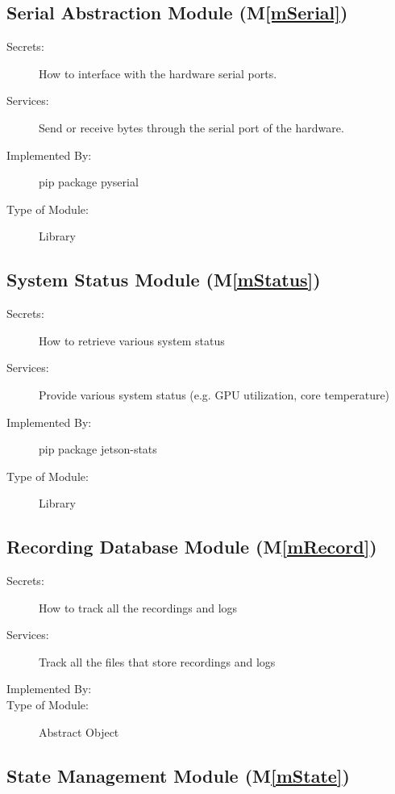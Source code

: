 \documentclass[12pt, titlepage]{article}
\newcommand{\mref}[1]{M\ref{#1}}
\begin{document}
\subsection{Serial Abstraction Module (\mref{mSerial})}

\begin{description}
  \item[Secrets:] How to interface with the hardware serial ports.
  \item[Services:] Send or receive bytes through the serial port of the hardware.
  \item[Implemented By:] pip package pyserial
  \item[Type of Module:] Library
\end{description}

\subsection{System Status Module (\mref{mStatus})}

\begin{description}
  \item[Secrets:] How to retrieve various system status
  \item[Services:] Provide various system status (e.g. GPU utilization, core
        temperature)
  \item[Implemented By:] pip package jetson-stats
  \item[Type of Module:] Library
\end{description}

\subsection{Recording Database Module (\mref{mRecord})}

\begin{description}
  \item[Secrets:] How to track all the recordings and logs
  \item[Services:] Track all the files that store recordings and logs
  \item[Implemented By:] \progname
  \item[Type of Module:] Abstract Object
\end{description}

\subsection{State Management Module (\mref{mState})}
\end{document}
